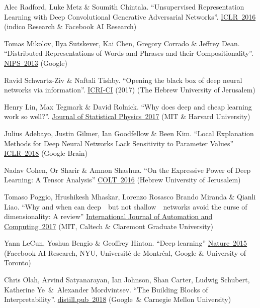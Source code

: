 \documentclass{article}
\begin{document}
\begin{thebibliography}{10}
 Alec Radford, Luke Metz \& Soumith Chintala. ``Unsupervised Representation Learning with Deep Convolutional Generative Adversarial Networks''. \href{https://arxiv.org/abs/1511.06434}{ICLR~2016} (indico Research \& Facebook AI Research)

 Tomas Mikolov, Ilya Sutskever, Kai Chen, Gregory Corrado \& Jeffrey Dean. ``Distributed Representations of Words and Phrases and their Compositionality''. \href{https://papers.nips.cc/paper/5021-distributed-representations-of-words-and-phrases-and-their-compositionality.pdf}{NIPS~2013} (Google)

 Ravid Schwartz-Ziv \& Naftali Tishby. ``Opening the black box of deep neural networks via information''. \href{https://arxiv.org/pdf/1703.00810.pdf}{ICRI-CI} (2017) (The Hebrew University of Jerusalem) 

 Henry Lin, Max Tegmark \& David Rolnick. ``Why does deep and cheap learning work so well?''. \href{https://arxiv.org/abs/1608.08225}{Journal of Statistical Physics~2017} (MIT \& Harvard University)

 Julius Adebayo, Justin Gilmer, Ian Goodfellow \& Been Kim. ``Local Explanation Methods for Deep Neural Networks Lack Sensitivity to Parameter Values'' \href{https://openreview.net/pdf?id=SJOYTK1vM}{ICLR~2018} (Google Brain)

 Nadav Cohen, Or Sharir \& Amnon Shashua. ``On the Expressive Power of Deep Learning: A Tensor Analysis'' \href{http://proceedings.mlr.press/v49/cohen16.pdf}{COLT~2016} (Hebrew University of Jerusalem)

 Tomaso Poggio, Hrushikesh Mhaskar, Lorenzo Rosasco Brando Miranda \& Qianli Liao. ``Why and when can deep~\textemdash~but not shallow~\textemdash~networks avoid the curse of dimensionality: A review'' \href{https://link.springer.com/article/10.1007/s11633-017-1054-2}{International Journal of Automation and Computing~2017} (MIT, Caltech \& Claremont Graduate University)

 Yann LeCun, Yoshua Bengio \& Geoffrey Hinton. ``Deep learning'' \href{https://www.cs.toronto.edu/~hinton/absps/NatureDeepReview.pdf}{Nature~2015} (Facebook AI Research, NYU, Universit\'e de Montr\'eal, Google \& University of Toronto)

 Chris Olah, Arvind Satyanarayan, Ian Johnson, Shan Carter, Ludwig Schubert, Katherine Ye~\&~Alexander Mordvintsev. ``The Building Blocks of Interpretability''. \href{https://distill.pub/2018/building-blocks/}{distill.pub~2018} (Google~\& Carnegie Mellon University)


\end{thebibliography}
\end{document}
